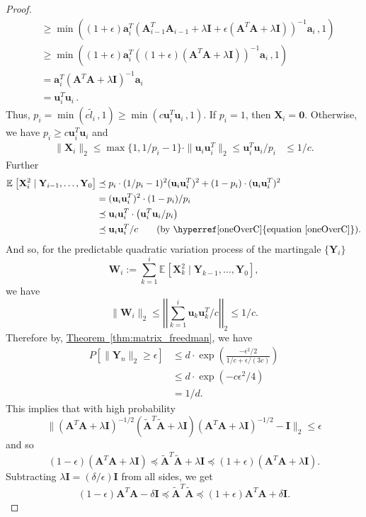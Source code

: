 \documentclass[11pt]{article}
\numberwithin{equation}{section}
\theoremstyle{definition}
\theoremstyle{plain}
\newcommand{\expref}[2]{\hyperref[#2]{#1~\ref{#2}}}
\newcommand{\expeqref}[2]{\hyperref[#2]{#1~\eqref{#2}}}
\newcommand{\bv}[1]{\mathbf{#1}}
\newcommand{\norm}[1]{\|#1\|}
\newcommand{\expct}[3]{\mathbb{E}_{{#1}_{#2}}\left[#3\right]}
\newcommand{\prob}[1]{P\left[#1\right]}
\begin{document}
\begin{proof}
\begin{align}
                    &\geq \min((1+\epsilon)\bv{a}_i^T (\bv{A}_{i-1}^T \bv{A}_{i-1} + \lambda \bv{I} + \epsilon (\bv{A}^T\bv{A} + \lambda \bv{I}))^{-1} \bv{a}_i\,, 1) \nonumber\\
                    &\geq \min((1+\epsilon)\bv{a}_i^T ((1+\epsilon)(\bv{A}^T \bv{A} + \lambda \bv{I}))^{-1} \bv{a}_i\,, 1) \nonumber\\
                    &= \bv{a}_i^T (\bv{A}^T\bv{A} + \lambda\bv{I})^{-1} \bv{a}_i \label{ltildeBound}\\
                    &= \bv{u}_i^T\bv{u}_i\,.\nonumber
    \end{align}
    Thus,
    $
        p_i = \min(c \tilde{l}_i\,, 1) \geq \min(c \bv{u}_i^T \bv{u}_i\,, 1).
    $
    If $p_i = 1$, then $\bv{X}_i = \bv 0$.
    Otherwise, we have $p_i \geq c \bv{u}_i^T \bv{u}_i$ and
    \begin{align}\label{oneOverC}
        \|\bv{X}_i\|_2 \le \max \{ 1, 1/p_i-1 \} \cdot \norm{\bv{u}_i \bv{u}_i^T}_2 \le  \bv{u}_i^T\bv{u}_i/p_i  &\leq 1 / c.
    \end{align}
    Further
    \begin{align*}
        \expct{}{}{\bv{X}_i^2 \mid \bv{Y}_{i-1},\ldots,\bv{Y}_{0}} &\preceq p_i \cdot (1 / p_i - 1)^2 (\bv{u}_i \bv{u}_i^T)^2 + (1 - p_i) \cdot (\bv{u}_i \bv{u}_i^T)^2\\
                                &= (\bv{u}_i \bv{u}_i^T)^2 \cdot (1-p_i)/p_i\\
			&\preceq \bv{u}_i \bv{u}_i^T \cdot \left (\bv{u}_i^T\bv{u}_i /p_i \right )\\
        &\preceq \bv{u}_i \bv{u}_i^T / c\tag{\text{by
          \expeqref{equation}{oneOverC}}}.
    \end{align*}
    And so, for the predictable quadratic variation process of the martingale $\{\bv{Y}_i\}$
    $$
        \bv{W}_i := \sum_{k=1}^i \expct{}{}{\bv{X}_k^2 \mid \bv{Y}_{k-1},\ldots,\bv{Y}_{0}},
    $$
    we have
    $$
        \norm{\bv{W}_i}_2 \leq \left | \left |\sum_{k=1}^i \bv{u}_k \bv{u}_k^T / c \right | \right |_2 \le 1/c.
    $$
    Therefore by, \expref{Theorem}{thm:matrix_freedman}, we have
    \begin{align*}
        \prob{\norm{\bv{Y}_n}_2\geq \epsilon} &\leq d\cdot\exp\left(\frac{-\epsilon^2/2}{1/c + \epsilon/(3c)}\right)\\
                                              &\leq d\cdot\exp(-c\epsilon^2/4)\\
                                              &= 1/d.
    \end{align*}
    This implies that with high probability
    $$
        \norm{(\bv{A}^T\bv{A} + \lambda \bv{I})^{-1/2}(\bv{\tilde{A}}^T\bv{\tilde{A}} + \lambda\bv{I})(\bv{A}^T\bv{A} + \lambda \bv{I})^{-1/2} - \bv{I}}_2 \leq \epsilon
    $$
    and so
    $$
        (1-\epsilon)(\bv{A}^T\bv{A} + \lambda \bv{I}) \preceq \bv{\tilde{A}}^T\bv{\tilde{A}} + \lambda\bv{I} \preceq (1+\epsilon)(\bv{A}^T\bv{A} + \lambda \bv{I}).
    $$
    Subtracting $\lambda\bv{I} = (\delta/\epsilon) \bv I$ from all sides, we get
    $$
        (1-\epsilon)\bv{A}^T\bv{A} - \delta\bv{I} \preceq \bv{\tilde{A}}^T\bv{\tilde{A}} \preceq (1+\epsilon)\bv{A}^T\bv{A} + \delta\bv{I}.
    $$


\end{proof}
\end{document}
